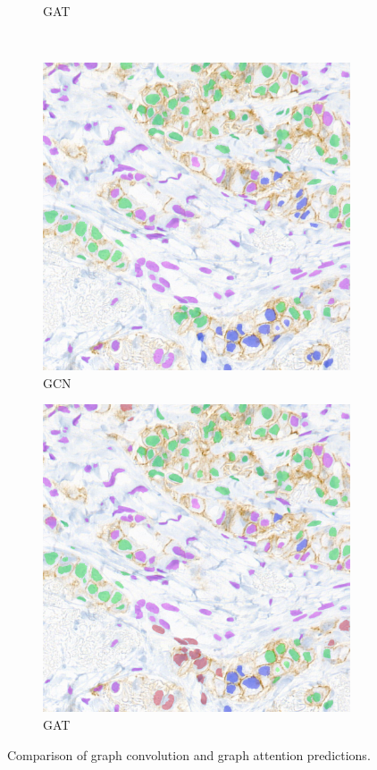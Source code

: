 \begin{figure}[H]
\begin{subfigure}[b]{0.45\textwidth}
    \caption{GAT}
  \end{subfigure}
  \\
  \begin{subfigure}[b]{0.45\textwidth}
    \includegraphics[width=\textwidth]{imgs/qual/breast/gcn-full3.png}
    \caption{GCN}
  \end{subfigure}
  \hfill
  \begin{subfigure}[b]{0.45\textwidth}
    \includegraphics[width=\textwidth]{imgs/qual/breast/gat-full3.png}
    \caption{GAT}
  \end{subfigure}
    \caption{Comparison of graph convolution and graph attention predictions.}
    \label{fig:breast-ex2}
\end{figure}

